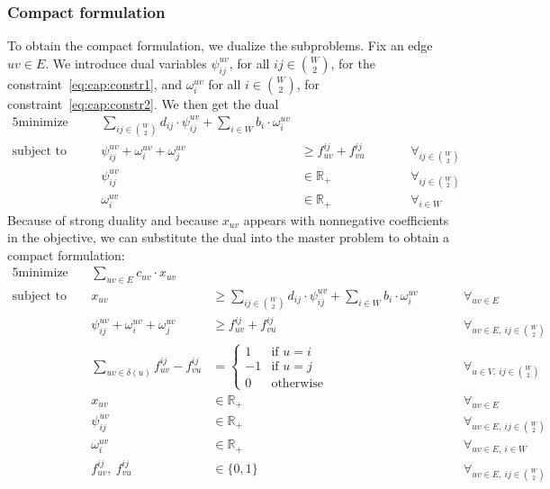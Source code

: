 \subsubsection{Compact formulation}
To obtain the compact formulation, we dualize the subproblems.
Fix an edge $uv \in E$.
We introduce dual variables $\psi_{ij}^{uv}$, for all $ij \in \binom W 2$, for the constraint~\eqref{eq:cap:constr1}, and $\omega_i^{uv}$ for all $i \in \binom W 2$, for constraint~\eqref{eq:cap:constr2}.
We then get the dual
\begin{alignat*}{5}
    \text{minimize}\quad && \sum_{ij \in \binom{W}{2}} d_{ij} \cdot \psi_{ij}^{uv} + \sum_{i \in W} b_i \cdot \omega_i^{uv} &&& \\
    \text{subject to}\quad && \psi_{ij}^{uv} + \omega_i^{uv} + \omega_j^{uv} &\ge f_{uv}^{ij} + f_{vu}^{ij} &&\qquad \forall_{ij \in \binom W 2} \\
    && \psi_{ij}^{uv} &\in \mathbb{R}_+ &&\qquad \forall_{ij \in \binom{W}{2}} \\
    && \omega_i^{uv} &\in \mathbb{R}_+ &&\qquad \forall_{i \in W}
\end{alignat*}
Because of strong duality and because $x_{uv}$ appears with nonnegative coefficients in the objective, we can substitute the dual into the master problem to obtain a compact formulation:
\begin{alignat*}{5}
    \text{minimize}\ && \sum_{uv \in E} c_{uv} \cdot x_{uv} &&& \\
    \text{subject to}\ && x_{uv} &\ge \sum_{ij \in \binom{W}{2}} d_{ij} \cdot \psi_{ij}^{uv} + \sum_{i \in W} b_i \cdot \omega_i^{uv} &&\qquad \forall_{uv \in E} \\
    && \psi_{ij}^{uv} + \omega_i^{uv} + \omega_j^{uv} &\ge f_{uv}^{ij} + f_{vu}^{ij} &&\qquad \forall_{uv \in E,\ ij \in \binom W 2} \\
    && \sum_{uv \in \delta(u)} f_{uv}^{ij} - f_{vu}^{ij} &= \begin{cases}
                                                                1 & \text{if $u = i$} \\
                                                                -1 & \text{if $u = j$} \\
                                                                0 & \text{otherwise}
    \end{cases} &&\qquad \forall_{u \in V,\ ij \in \binom{W}{2}} \\
    && x_{uv} &\in \mathbb{R}_+ &&\qquad \forall_{uv \in E} \\
    && \psi_{ij}^{uv} &\in \mathbb{R}_+ &&\qquad \forall_{uv \in E,\ ij \in \binom{W}{2}} \\
    && \omega_i^{uv} &\in \mathbb{R}_+ &&\qquad \forall_{uv \in E,\ i \in W} \\
    && f_{uv}^{ij},\ f_{vu}^{ij} &\in \{ 0, 1 \} &&\qquad \forall_{uv \in E,\ ij \in \binom{W}{2}}
\end{alignat*}

